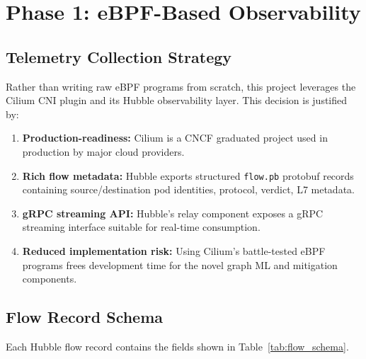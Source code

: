 \section{Phase 1: eBPF-Based Observability}
\label{sec:design_phase1}

\subsection{Telemetry Collection Strategy}

Rather than writing raw eBPF programs from scratch, this project leverages the Cilium CNI
plugin and its Hubble observability layer. This decision is justified by:

\begin{enumerate}
  \item \textbf{Production-readiness:} Cilium is a CNCF graduated project used in
  production by major cloud providers.
  \item \textbf{Rich flow metadata:} Hubble exports structured \texttt{flow.pb} protobuf
  records containing source/destination pod identities, protocol, verdict, L7 metadata.
  \item \textbf{gRPC streaming API:} Hubble's relay component exposes a gRPC streaming
  interface suitable for real-time consumption.
  \item \textbf{Reduced implementation risk:} Using Cilium's battle-tested eBPF programs
  frees development time for the novel graph ML and mitigation components.
\end{enumerate}

\subsection{Flow Record Schema}

Each Hubble flow record contains the fields shown in Table~\ref{tab:flow_schema}.

